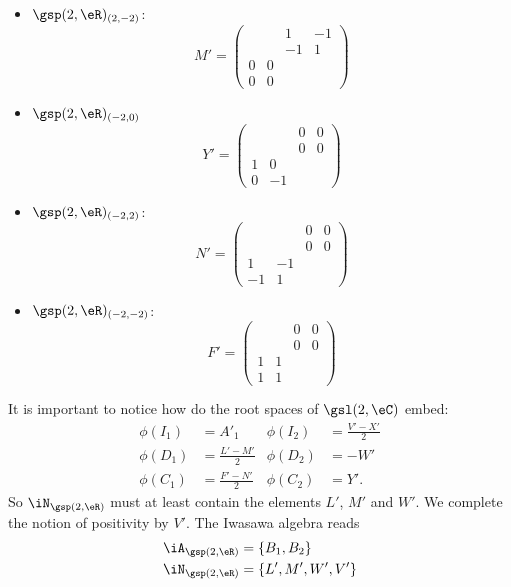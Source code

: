 \begin{itemize}
\[	      \]
	\item $\gsp(2,\eR)_{(2,-2)}$:
	      \[
		      M'=
		      \begin{pmatrix}
			        &   & 1  & -1 \\
			        &   & -1 & 1  \\
			      0 & 0           \\0&0
		      \end{pmatrix}
	      \]
	\item $\gsp(2,\eR)_{(-2,0)}$
	      \[
		      Y'=
		      \begin{pmatrix}
			        &   & 0 & 0 \\&&0&0\\
			      1 & 0         \\0&-1
		      \end{pmatrix}
	      \]
	\item $\gsp(2,\eR)_{(-2,2)}$:
	      \[
		      N'=\begin{pmatrix}
			         &    & 0 & 0 \\&&0&0\\
			      1  & -1         \\
			      -1 & 1
		      \end{pmatrix}
	      \]
	\item $\gsp(2,\eR)_{(-2,-2)}$:
	      \[
		      F'=\begin{pmatrix}
			        &   & 0 & 0 \\
			        &   & 0 & 0 \\
			      1 & 1         \\
			      1 & 1
		      \end{pmatrix}
	      \]
\end{itemize}
It is important to notice how do the root spaces of $\gsl(2,\eC)$ embed:
\begin{align}
	\phi(I_1) & =A'_1              & \phi(I_2) & =\frac{ V'-X' }{ 2 } \\
	\phi(D_1) & =\frac{ L'-M' }{2} & \phi(D_2) & =-W'                 \\
	\phi(C_1) & =\frac{ F'-N' }{2} & \phi(C_2) & =Y'.
\end{align}
So $\iN_{\gsp(2,\eR)}$ must at least contain the elements $L'$, $M'$ and $W'$. We complete the notion of positivity by $V'$. The Iwasawa algebra reads
\[
	\begin{split}
		\iA_{\gsp(2,\eR)} & =\{ B_1,B_2 \}     \\
		\iN_{\gsp(2,\eR)} & =\{ L',M',W',V' \}
	\end{split}
\]
